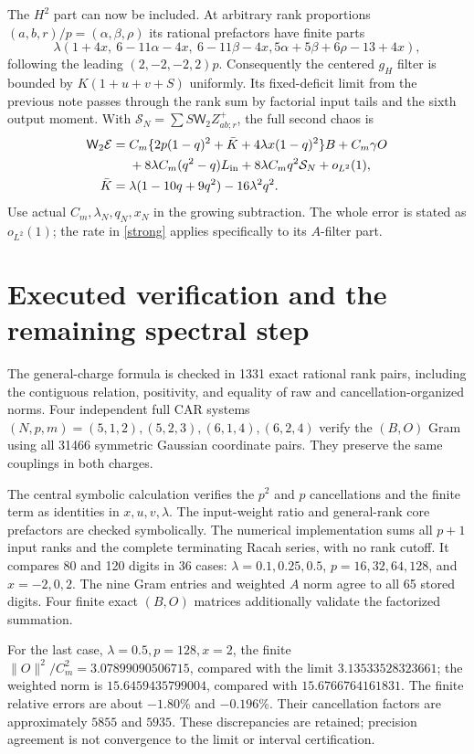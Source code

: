 \documentclass[11pt,a4paper]{article}
\newcommand{\W}{\mathsf W_2}
\begin{document}
The $H^2$ part can now be included. At arbitrary rank proportions
$(a,b,r)/p=(\alpha,\beta,\rho)$ its rational prefactors have finite
parts
\begin{equation}
 \lambda(1+4x,\ 6-11\alpha-4x,\ 6-11\beta-4x,
                     5\alpha+5\beta+6\rho-13+4x),
\end{equation}
following the leading $(2,-2,-2,2)p$.
Consequently the centered $g_H$ filter is bounded by
$K(1+u+v+S)$ uniformly. Its fixed-deficit limit from the previous
note passes through the rank sum by factorial input tails and
the sixth output moment. With
$\mathcal S_N=\sum S\W Z^+_{ab;r}$, the full second chaos is
\begin{align}
 \W\mathcal E={}&C_m\{2p(1-q)^2+\bar K+4\lambda x(1-q)^2\}B
       +C_m\gamma O\notag\\
 &+8\lambda C_m(q^2-q)L_{\rm in}
       +8\lambda C_mq^2\mathcal S_N+o_{L^2}(1),\label{core}\\
 \bar K={}&\lambda(1-10q+9q^2)-16\lambda^2q^2.
\end{align}
Use actual $C_m,\lambda_N,q_N,x_N$ in the growing subtraction.
The whole error is stated as $o_{L^2}(1)$; the rate in
\eqref{strong} applies specifically to its $A$-filter part.

\newpage
\section{Executed verification and the remaining spectral step}
The general-charge formula is checked in 1331 exact rational rank
pairs, including the contiguous relation, positivity, and equality
of raw and cancellation-organized norms. Four independent full CAR
systems $(N,p,m)=(5,1,2),(5,2,3),(6,1,4),(6,2,4)$ verify the
$(B,O)$ Gram using all 31466 symmetric Gaussian coordinate pairs.
They preserve the same couplings in both charges.

The central symbolic calculation verifies the $p^2$ and $p$
cancellations and the finite term as identities in $x,u,v,\lambda$.
The input-weight ratio and general-rank core prefactors are checked
symbolically. The numerical implementation sums all $p+1$ input
ranks and the complete terminating Racah series, with no rank cutoff.
It compares 80 and 120 digits in 36 cases:
$\lambda=0.1,0.25,0.5$, $p=16,32,64,128$, and $x=-2,0,2$.
The nine Gram entries and weighted $A$ norm agree to all 65 stored
digits. Four finite exact $(B,O)$ matrices additionally validate
the factorized summation.

For the last case, $\lambda=0.5,p=128,x=2$, the finite
$\|O\|^2/C_m^2=3.07899090506715$, compared with the limit
$3.13533528323661$; the weighted norm is $15.6459435799004$,
compared with $15.6766764161831$. The finite relative errors are
about $-1.80\%$ and $-0.196\%$. Their cancellation factors are
approximately $5855$ and $5935$. These discrepancies are retained;
precision agreement is not convergence to the limit or interval
certification.
\end{document}
